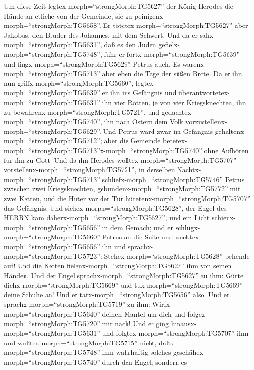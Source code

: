  Um diese Zeit legtex-morph=``strongMorph:TG5627'' der König
Herodes die Hände an etliche von der Gemeinde, sie zu
peinigenx-morph=``strongMorph:TG5658''.  Er
tötetex-morph=``strongMorph:TG5627'' aber Jakobus, den Bruder des
Johannes, mit dem Schwert.  Und da er
sahx-morph=``strongMorph:TG5631'', daß es den Juden
gefielx-morph=``strongMorph:TG5748'', fuhr er
fortx-morph=``strongMorph:TG5639'' und
fingx-morph=``strongMorph:TG5629'' Petrus auch. Es
warenx-morph=``strongMorph:TG5713'' aber eben die Tage der süßen Brote.
 Da er ihn nun griffx-morph=``strongMorph:TG5660'',
legtex-morph=``strongMorph:TG5639'' er ihn ins Gefängnis und
überantwortetex-morph=``strongMorph:TG5631'' ihn vier Rotten, je von
vier Kriegsknechten, ihn zu bewahrenx-morph=``strongMorph:TG5721'', und
gedachtex-morph=``strongMorph:TG5740'', ihn nach Ostern dem Volk
vorzustellenx-morph=``strongMorph:TG5629''.  Und Petrus ward
zwar im Gefängnis gehaltenx-morph=``strongMorph:TG5712''; aber die
Gemeinde
betetex-morph=``strongMorph:TG5713''x-morph=``strongMorph:TG5740'' ohne
Aufhören für ihn zu Gott.  Und da ihn Herodes
wolltex-morph=``strongMorph:TG5707''
vorstellenx-morph=``strongMorph:TG5721'', in derselben
Nachtx-morph=``strongMorph:TG5713''
schliefx-morph=``strongMorph:TG5746'' Petrus zwischen zwei
Kriegsknechten, gebundenx-morph=``strongMorph:TG5772'' mit zwei Ketten,
und die Hüter vor der Tür hütetenx-morph=``strongMorph:TG5707'' das
Gefängnis.  Und siehex-morph=``strongMorph:TG5628'', der
Engel des HERRN kam daherx-morph=``strongMorph:TG5627'', und ein Licht
schienx-morph=``strongMorph:TG5656'' in dem Gemach; und er
schlugx-morph=``strongMorph:TG5660'' Petrus an die Seite und
wecktex-morph=``strongMorph:TG5656'' ihn und
sprachx-morph=``strongMorph:TG5723'':
Stehex-morph=``strongMorph:TG5628'' behende auf! Und die Ketten
fielenx-morph=``strongMorph:TG5627'' ihm von seinen Händen. 
Und der Engel sprachx-morph=``strongMorph:TG5627'' zu ihm: Gürte
dichx-morph=``strongMorph:TG5669'' und tux-morph=``strongMorph:TG5669''
deine Schuhe an! Und er tatx-morph=``strongMorph:TG5656'' also. Und er
sprachx-morph=``strongMorph:TG5719'' zu ihm:
Wirfx-morph=``strongMorph:TG5640'' deinen Mantel um dich und
folgex-morph=``strongMorph:TG5720'' mir nach!  Und er ging
hinausx-morph=``strongMorph:TG5631'' und
folgtex-morph=``strongMorph:TG5707'' ihm und
wußtex-morph=``strongMorph:TG5715'' nicht,
daßx-morph=``strongMorph:TG5748'' ihm wahrhaftig solches
geschähex-morph=``strongMorph:TG5740'' durch den Engel; sondern es

